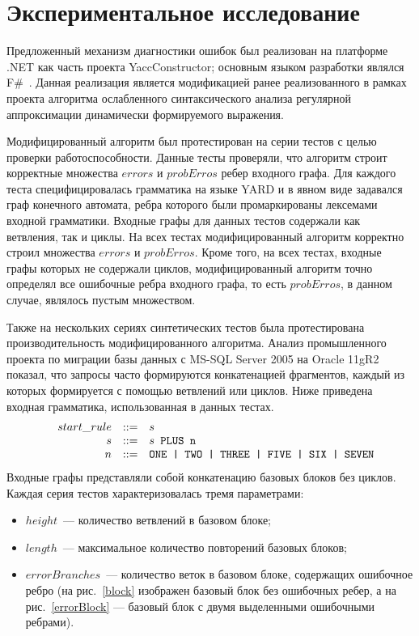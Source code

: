 \section{Экспериментальное исследование}
Предложенный механизм диагностики ошибок был реализован на платформе .NET как часть проекта YaccConstructor; основным языком разработки являлся F\#~\cite{FSharp}. Данная реализация является модификацией ранее реализованного в рамках проекта алгоритма ослабленного синтаксического анализа регулярной аппроксимации динамически формируемого выражения.

Модифицированный алгоритм был протестирован на серии тестов с целью проверки работоспособности. Данные тесты проверяли, что алгоритм строит корректные множества $errors$ и $probErros$ ребер входного графа. Для каждого теста специфицировалась грамматика на языке YARD и в явном виде задавался граф конечного автомата, ребра которого были промаркированы лексемами входной грамматики. Входные графы для данных тестов содержали как ветвления, так и циклы. На всех тестах модифицированный алгоритм корректно строил множества $errors$ и $probErros$. Кроме того, на всех тестах, входные графы которых не содержали циклов, модифицированный алгоритм точно определял все ошибочные ребра входного графа, то есть $probErros$, в данном случае, являлось пустым множеством.

Также на нескольких сериях синтетических тестов была протестирована производительность модифицированного алгоритма. Анализ промышленного проекта по миграции базы данных с MS-SQL Server 2005 на Oracle 11gR2 показал, что запросы часто формируются конкатенацией фрагментов, каждый из которых формируется с помощью ветвлений или циклов. Ниже приведена входная грамматика, использованная в данных тестах.
$$
\begin{array}{crcl}
& start\_rule &::=& s \\
& s & ::= & s \mbox{\texttt{ PLUS }} \mbox{\texttt{n}}\\
& n & ::= & \mbox{\texttt{ONE | }} \mbox{\texttt{TWO | }} \mbox{\texttt{THREE | }} \mbox{\texttt{FIVE | }} \mbox{\texttt{SIX | }} \mbox{\texttt{SEVEN}}
\end{array}
$$
Входные графы представляли собой конкатенацию базовых блоков без циклов. Каждая серия тестов характеризовалась тремя параметрами: 
\begin{itemize}
  \item $height$~--- количество ветвлений в базовом блоке;
  \item $length$~--- максимальное количество повторений базовых блоков;
  \item $errorBranches$~--- количество веток в базовом блоке, содержащих ошибочное ребро (на рис.~\ref{block} изображен базовый блок без ошибочных ребер, а на рис.~\ref{errorBlock} --- базовый блок с двумя выделенными ошибочными ребрами).
\end{itemize}

